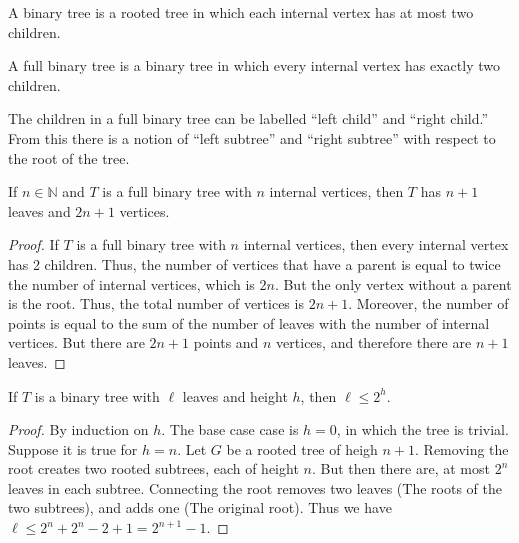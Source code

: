 \documentclass[crop=false,class=book,oneside]{standalone}
\begin{document}
            \begin{definition}
                A binary tree is a rooted tree in which each internal
                vertex has at most two children.
            \end{definition}
            \begin{definition}
                A full binary tree is a binary tree in which every
                internal vertex has exactly two children.
            \end{definition}
            \begin{remark}
                The children in a full binary tree can be labelled
                ``left child'' and ``right child.'' From this there
                is a notion of ``left subtree'' and ``right subtree''
                with respect to the root of the tree.
            \end{remark}
            \begin{theorem}
                If $n\in\mathbb{N}$ and $T$ is a full binary tree with
                $n$ internal vertices,
                then $T$ has $n+1$ leaves and $2n+1$ vertices.
            \end{theorem}
            \begin{proof}
                If $T$ is a full binary tree with $n$ internal vertices,
                then every internal vertex has 2 children. Thus, the
                number of vertices that have a parent is equal to twice
                the number of internal vertices, which is $2n$. But the
                only vertex without a parent is the root. Thus, the
                total number of vertices is $2n+1$. Moreover, the number
                of points is equal to the sum of the number of leaves
                with the number of internal vertices. But there are
                $2n+1$ points and $n$ vertices, and therefore there
                are $n+1$ leaves.
            \end{proof}
            \begin{theorem}
                If $T$ is a binary tree with $\ell$ leaves and height
                $h$, then $\ell\leq2^{h}$.
            \end{theorem}
            \begin{proof}
                By induction on $h$. The base case case is $h=0$, in
                which the tree is trivial. Suppose it is true for
                $h=n$. Let $G$ be a rooted tree of heigh $n+1$.
                Removing the root creates two rooted subtrees,
                each of height $n$. But then there are, at most
                $2^{n}$ leaves in each subtree. Connecting the root
                removes two leaves (The roots of the two subtrees),
                and adds one (The original root). Thus we have
                $\ell\leq{2^{n}+2^{n}-2+1}=2^{n+1}-1$.
            \end{proof}
\end{document}
